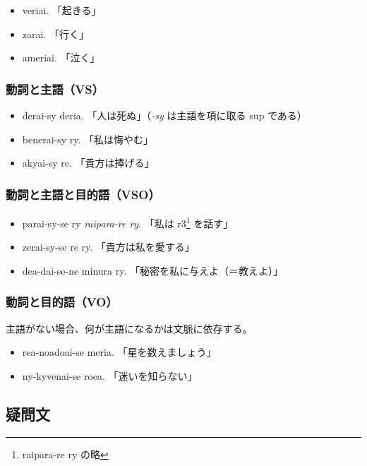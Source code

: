 \begin{itemize}
    \item veriai.   「起きる」
    \item zarai.    「行く」
    \item ameriai.  「泣く」
\end{itemize}

\subsubsection{動詞と主語（VS）}
\begin{itemize}
    \item derai-sy deria.   「人は死ぬ」（\emph{-sy} は主語を項に取る sup である）
    \item benerai-sy ry.    「私は悔やむ」
    \item akyai-sy re.      「貴方は捧げる」
\end{itemize}

\subsubsection{動詞と主語と目的語（VSO）}

\begin{itemize}
    \item parai-sy-se ry \emph{raipara-re ry}. 「私は r3\footnote{raipara-re ry の略} を話す」
    \item zerai-sy-se re ry. 「貴方は私を愛する」
    \item dea-dai-se-ne minura ry. 「秘密を私に与えよ（＝教えよ）」
\end{itemize}

\subsubsection{動詞と目的語（VO）}
主語がない場合、何が主語になるかは文脈に依存する。

\begin{itemize}
    \item rea-noadoai-se meria. 「星を数えましょう」
    \item ny-kyvenai-se roea. 「迷いを知らない」
\end{itemize}

\clearpage

\subsection{疑問文}

